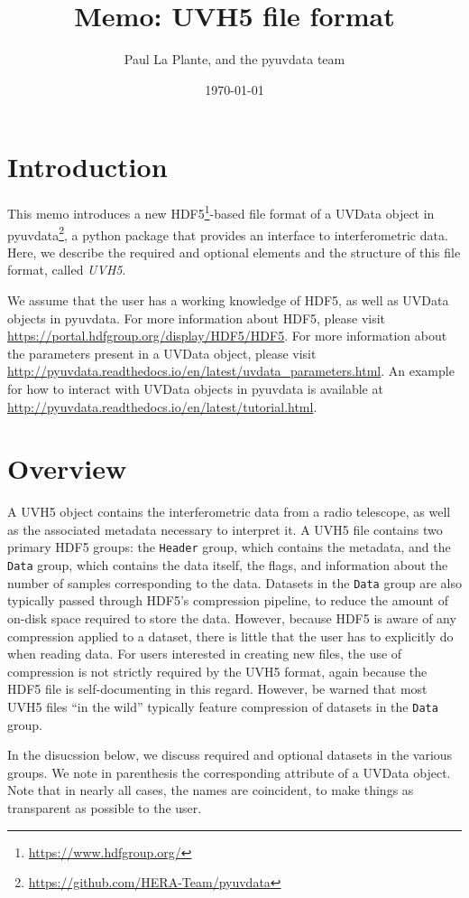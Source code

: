 \documentclass[11pt, oneside]{article}
\title{Memo: UVH5 file format}
\author{Paul La Plante, and the pyuvdata team}
\date{\today}
\begin{document}
\maketitle
\section{Introduction}
This memo introduces a new HDF5\footnote{\url{https://www.hdfgroup.org/}}-based
file format of a UVData object in
pyuvdata\footnote{\url{https://github.com/HERA-Team/pyuvdata}}, a python package
that provides an interface to interferometric data. Here, we describe the
required and optional elements and the structure of this file format, called
\textit{UVH5}.

We assume that the user has a working knowledge of HDF5, as well as UVData
objects in pyuvdata. For more information about HDF5, please visit
\url{https://portal.hdfgroup.org/display/HDF5/HDF5}. For more information about
the parameters present in a UVData object, please visit
\url{http://pyuvdata.readthedocs.io/en/latest/uvdata_parameters.html}. An
example for how to interact with UVData objects in pyuvdata is available at
\url{http://pyuvdata.readthedocs.io/en/latest/tutorial.html}.

\section{Overview}
A UVH5 object contains the interferometric data from a radio telescope, as well
as the associated metadata necessary to interpret it. A UVH5 file contains two
primary HDF5 groups: the \verb+Header+ group, which contains the metadata, and
the \verb+Data+ group, which contains the data itself, the flags, and
information about the number of samples corresponding to the data. Datasets in
the \verb+Data+ group are also typically passed through HDF5's compression
pipeline, to reduce the amount of on-disk space required to store the data.
However, because HDF5 is aware of any compression applied to a dataset, there is
little that the user has to explicitly do when reading data. For users
interested in creating new files, the use of compression is not strictly
required by the UVH5 format, again because the HDF5 file is self-documenting in
this regard. However, be warned that most UVH5 files ``in the wild'' typically
feature compression of datasets in the \verb+Data+ group.

In the disucssion below, we discuss required and optional datasets in the
various groups. We note in parenthesis the corresponding attribute of a UVData
object. Note that in nearly all cases, the names are coincident, to make things
as transparent as possible to the user.
\end{document}
